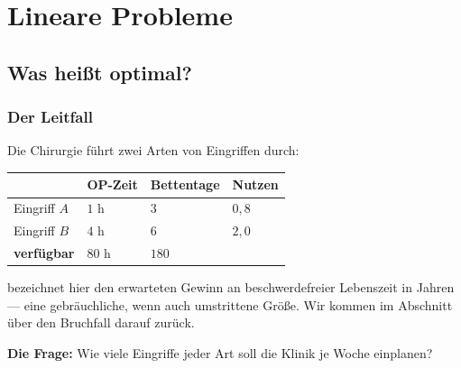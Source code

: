 \part{Lineare Probleme}

\chapter{Was heißt optimal?}

\section{Der Leitfall}

\begin{merksatz}
Die Chirurgie führt zwei Arten von Eingriffen durch:

\begin{center}
{\small
\renewcommand{\arraystretch}{1.5}
\begin{tabular}{@{}P{2.0cm}P{2.2cm}P{2.2cm}P{2.0cm}@{}}
\toprule
& \textbf{OP-Zeit} & \textbf{Bettentage} & \textbf{Nutzen}\\
\midrule
Eingriff $A$ & $1$ h & $3$ & $0{,}8$\\
Eingriff $B$ & $4$ h & $6$ & $2{,}0$\\
\midrule
\textbf{verfügbar} & $80$ h & $180$ & \\
\bottomrule
\end{tabular}}
\end{center}

 bezeichnet hier den erwarteten Gewinn an beschwerdefreier Lebenszeit in Jahren --- eine gebräuchliche, wenn auch umstrittene Größe. Wir kommen im Abschnitt über den Bruchfall darauf zurück.

\textbf{Die Frage:} Wie viele Eingriffe jeder Art soll die Klinik je Woche einplanen?
\end{merksatz}

